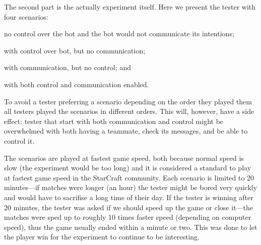 The second part is the actually experiment itself. Here we present the tester with four scenarios:
\begin{inparaenum}[1\upshape)]
	\item no control over the bot and the bot would not communicate its intentions;
	\item with control over bot, but no communication;
	\item with communication, but no control; and
	\item with both control and communication enabled.
\end{inparaenum}
To avoid a tester preferring a scenario depending on the order they played them all testers played
the scenarios in different orders. This will, however, have a side effect: tester that start with both
communication and control might be overwhelmed with both having a teammate, check its messages, and
be able to control it.

The scenarios are played at fastest game speed, both because normal speed is slow (the experiment
would be too long) and it is considered a standard to play at fastest game speed in the StarCraft
community. Each scenario is limited to 20 minutes—if matches were longer (an hour) the tester might
be bored very quickly and would have to sacrifise a long time of their day. If the tester is winning
after 20 minutes, the tester was asked if we should speed up the game or close it—the matches were
sped up to roughly 10 times faster speed (depending on computer speed), thus the game usually ended
within a minute or two. This was done to let the player win for the experiment to continue to be
interesting.
